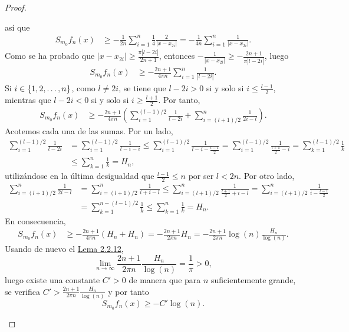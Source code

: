 \documentclass[a4paper, 12pt, oneside]{book}
\begin{document}
\begin{proof}
\begin{itemize}
        así que
        \begin{align*}
            S_{m_0}f_n(x) &\geq -\frac{1}{2n}\sum_{i=1}^n \frac{1}{4}\frac{2}{|x-x_{2i}|} = -\frac{1}{4n}\sum_{i=1}^n \frac{1}{|x-x_{2i}|}.
        \end{align*}
        Como se ha probado que $|x-x_{2i}| \geq \frac{\pi |l -2i|}{2n+1}$, entonces $-\frac{1}{|x-x_{2i}|} \geq -\frac{2n+1}{\pi|l-2i|}$, luego
        \begin{align*}
            S_{m_0}f_n(x) &\geq -\frac{2n+1}{4\pi n}\sum_{i=1}^n \frac{1}{|l-2i|}.
        \end{align*}
        Si $i \in \{1,2,\mathellipsis,n\}$, como $l \neq 2i$, se tiene que $l - 2i > 0$ si y solo si $i \leq \frac{l-1}{2}$, mientras que $l - 2i < 0$ si y solo si $i \geq \frac{l+1}{2}$. Por tanto,
        \begin{align*}
            S_{m_0}f_n(x) &\geq -\frac{2n+1}{4\pi n}\left(\sum_{i=1}^{(l-1)/2} \frac{1}{l-2i} +\sum_{i=(l+1)/2}^n \frac{1}{2i-l}\right).
        \end{align*}
        Acotemos cada una de las sumas. Por un lado,
        \begin{align*}
            \sum_{i=1}^{(l-1)/2}\frac{1}{l-2i} &= \sum_{i=1}^{(l-1)/2} \frac{1}{l-i-i} \leq \sum_{i=1}^{(l-1)/2} \frac{1}{l-i-\frac{l-1}{2}} = \sum_{i=1}^{(l-1)/2} \frac{1}{\frac{l+1}{2}-i} = \sum_{k=1}^{(l-1)/2} \frac{1}{k} \\ &\leq \sum_{k=1}^{n}\frac{1}{k} = H_n,
        \end{align*}
        utilizándose en la última desigualdad que $\frac{l-1}{2} \leq n$ por ser $l < 2n$. Por otro lado,
        \begin{align*}
            \sum_{i=(l+1)/2}^n \frac{1}{2i-l} &= \sum_{i=(l+1)/2}^n \frac{1}{i+i-l} \leq \sum_{i=(l+1)/2}^n \frac{1}{\frac{l+1}{2}+i-l} = \sum_{i=(l+1)/2}^n \frac{1}{i-\frac{l-1}{2}} \\ &= \sum_{k=1}^{n-(l-1)/2}\frac{1}{k} \leq \sum_{k=1}^n \frac{1}{k} = H_n.
        \end{align*}
        En consecuencia,
        \begin{align*}
            S_{m_0}f_n(x) &\geq -\frac{2n+1}{4\pi n}(H_n+H_n) = -\frac{2n+1}{2\pi n}H_n =-\frac{2n+1}{2\pi n}\log(n)\frac{H_n}{\log(n)} .
        \end{align*}
        Usando de nuevo el \hyperref[2.2.12]{\color{blue}Lema 2.2.12},
        \[\lim_{n\to\infty} \frac{2n+1}{2\pi n}\frac{H_n}{\log(n)} = \frac{1}{\pi} > 0,\]
        luego existe una constante $C'>0$ de manera que para $n$ suficientemente grande, se verifica $C' > \frac{2n+1}{2\pi n}\frac{H_n}{\log(n)}$ y por tanto
        \[S_{m_0}f_n(x) \geq -C'\log(n).\]
    

\end{itemize}
\end{proof}
\end{document}
